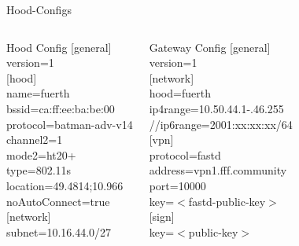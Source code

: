 \begin{frame}{Hood-Configs}
    \begin{columns}
        \begin{block}{Hood Config}
            \footnotesize
            [general]\\
            version=1\\[1ex]
            [hood]\\
            name=fuerth\\
            bssid=ca:ff:ee:ba:be:00\\
            protocol=batman-adv-v14\\
            channel2=1\\
            mode2=ht20+\\
            type=802.11s\\
            location=49.4814;10.966\\
            noAutoConnect=true\\[1ex]
            [network]\\
            subnet=10.16.44.0/27
        \end{block}
        \begin{block}{Gateway Config}
            \footnotesize
            [general]\\
            version=1\\[1ex]
            [network]\\
            hood=fuerth\\
            ip4range=10.50.44.1-.46.255\\
            //ip6range=2001:xx:xx:xx/64\\[1ex]
            [vpn]\\
            protocol=fastd\\
            address=vpn1.fff.community\\
            port=10000\\
            key=$<$fastd-public-key$>$\\[1ex]
            [sign]\\
            key=$<$public-key$>$\\
        \end{block}
    \end{columns}
\end{frame}

